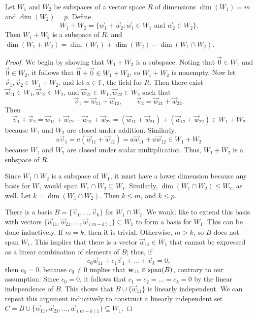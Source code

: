 \documentclass{homework}
\begin{document}
	\question Let $W_1$ and $W_2$ be subspaces of a vector space $R$ of dimensions $\dim(W_1) = m$ and $ \dim(W_2) = p$. Define
	\begin{equation*}
		W_1 + W_2 = \{\vec{w}_1 + \vec{w}_2 : \vec{w}_1 \in W_1 \text{ and } \vec{w}_2 \in W_2\}.
	\end{equation*}
	Then $W_1 + W_2$ is a subspace of $R$, and $\dim(W_1 + W_2) = \dim(W_1) + \dim(W_2) -\dim(W_1 \cap W_2)$.
	\begin{proof}
		We begin by showing that $W_1 + W_2$ is a subspace. Noting that $\vec{0} \in W_1$ and $\vec{0} \in W_2$, it follows that $\vec{0} + \vec{0} \in W_1 + W_2$, so $W_1 + W_2$ is nonempty. Now let $\vec{v}_1, \vec{v}_2 \in W_1 + W_2$, and let $a \in \mathbb{F}$, the field for $R$. Then there exist $\vec{w}_{11} \in W_1, \vec{w}_{12} \in W_2$, and $\vec{w}_{21} \in W_1, \vec{w}_{22} \in W_2$ such that
		\begin{equation*}
			\vec{v}_1 = \vec{w}_{11} + \vec{w}_{12}, \qquad \vec{v}_2 = \vec{w}_{21} + \vec{w}_{22}.
		\end{equation*}	
		Then
		\begin{equation*}
			\vec{v}_1 + \vec{v}_2 = \vec{w}_{11} + \vec{w}_{12} + \vec{w}_{21} + \vec{w}_{22} = (\vec{w}_{11} + \vec{w}_{21}) + (\vec{w}_{12} + \vec{w}_{22}) \in W_1 + W_2
		\end{equation*}
		because $W_1$ and $W_2$ are closed under addition. Similarly,
		\begin{equation*}
			a\vec{v}_1 = a(\vec{w}_{11} + \vec{w}_{12}) = a\vec{w}_{11} + a\vec{w}_{12} \in W_1 + W_2
		\end{equation*}
		because $W_1$ and $W_2$ are closed under scalar multiplication. Thus, $W_1 + W_2$ is a subspace of $R$.
		
		Since $W_1 \cap W_2$ is a subspace of $W_1$, it must have a lower dimension because any basis for $W_1$ would span $W_1 \cap W_2 \subseteq W_1$. Similarly, $\dim(W_1\cap W_2) \le W_2$, as well. Let $k=\dim(W_1\cap W_2)$. Then $k \le m$, and $k \le p$.
		
		There is a basis $B = \{\vec{v}_1, \dots, \vec{v}_k\}$ for $W_1\cap W_2$. We would like to extend this basis with vectors $\{\vec{w}_{11}, \vec{w}_{21}, \dots, \vec{w}_{(m-k)1}\}\subseteq W_1$ to form a basis for $W_1$. This can be done inductively. If $m = k$, then it is trivial. Otherwise, $m > k$, so $B$ does not span $W_1$. This implies that there is a vector $\vec{w}_{11} \in W_1$ that cannot be expressed as a linear combination of elements of $B$; thus, if
		\begin{equation*}
			c_0\vec{w}_{11} + c_1\vec{v}_1 + \dots + \vec{v}_k = 0,
		\end{equation*}
		then $c_0 = 0$, because $c_0\ne 0$ implies that $\mathbf{w}_{11} \in \mathrm{span}(B)$, contrary to our assumption. Since $c_0 = 0$, it follows that $c_1 = c_2 = \dots = c_k = 0$ by the linear independence of $B$. This shows that $B \cup\{\vec{w}_{11}\}$ is linearly independent. We can repeat this argument inductively to construct a linearly independent set $C = B \cup \{\vec{w}_{11}, \vec{w}_{21}, \dots, \vec{w}_{(m-k)1}\}\subseteq W_1$. 
		

\end{proof}
\end{document}

